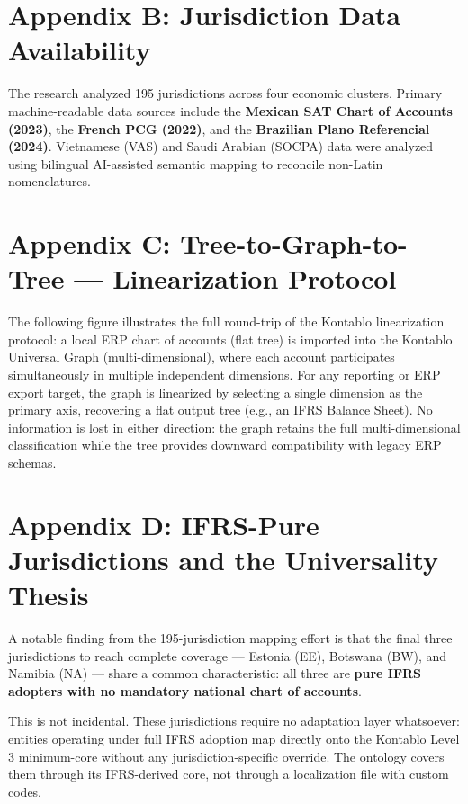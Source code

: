 \section*{Appendix B: Jurisdiction Data Availability}

The research analyzed 195 jurisdictions across four economic clusters. Primary machine-readable data sources include the \textbf{Mexican SAT Chart of Accounts (2023)}, the \textbf{French PCG (2022)}, and the \textbf{Brazilian Plano Referencial (2024)}. Vietnamese (VAS) and Saudi Arabian (SOCPA) data were analyzed using bilingual AI-assisted semantic mapping to reconcile non-Latin nomenclatures.

\section*{Appendix C: Tree-to-Graph-to-Tree — Linearization Protocol}

The following figure illustrates the full round-trip of the Kontablo linearization
protocol: a local ERP chart of accounts (flat tree) is imported into the Kontablo
Universal Graph (multi-dimensional), where each account participates simultaneously
in multiple independent dimensions. For any reporting or ERP export target, the
graph is linearized by selecting a single dimension as the primary axis, recovering
a flat output tree (e.g., an IFRS Balance Sheet). No information is lost in either
direction: the graph retains the full multi-dimensional classification while the tree
provides downward compatibility with legacy ERP schemas.



\section*{Appendix D: IFRS-Pure Jurisdictions and the Universality Thesis}

A notable finding from the 195-jurisdiction mapping effort is that the final three jurisdictions to reach complete coverage --- Estonia (EE), Botswana (BW), and Namibia (NA) --- share a common characteristic: all three are \textbf{pure IFRS adopters with no mandatory national chart of accounts}.

This is not incidental. These jurisdictions require no adaptation layer whatsoever: entities operating under full IFRS adoption map directly onto the Kontablo Level 3 minimum-core without any jurisdiction-specific override. The ontology covers them through its IFRS-derived core, not through a localization file with custom codes.

